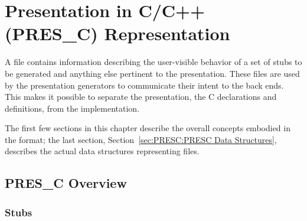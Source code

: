 

\chapter{Presentation in C/C++ (PRES\_C) Representation}
\label{cha:PRESC}

A \PRESC{} file contains information describing the user-visible behavior of a
set of stubs to be generated and anything else pertinent to the presentation.
These files are used by the presentation generators to communicate their intent
to the back ends.  This makes it possible to separate the presentation, the C
declarations and definitions, from the implementation.

The first few sections in this chapter describe the overall concepts embodied
in the \PRESC{} format; the last section, Section~\ref{sec:PRESC:PRESC Data Structures},
describes the actual \XDR{} data structures representing \PRESC{} files.



\section{PRES\_C Overview}
\label{sec:PRESC:PRESC Overview}



\subsection{Stubs}
\label{subsec:PRESC:Stubs}

